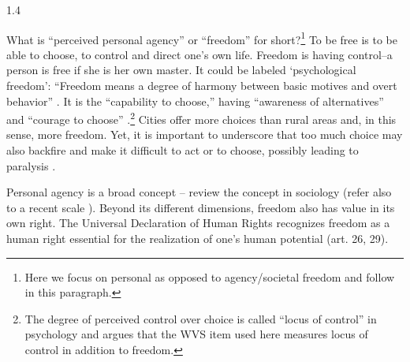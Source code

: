 \documentclass[10pt, letterpaper]{article}
\begin{document}
\begin{spacing}{1.4}
 
What is ``perceived personal agency'' or ``freedom'' for short?\footnote{Here we focus on personal as opposed to
  agency/societal freedom and follow \citet{aok_free_from_to} in this paragraph.} To be free is to be able to choose, to control and
direct one's own life. Freedom is having control--a person is free if she is her own master. It could be labeled `psychological freedom': ``Freedom means a degree of harmony between basic motives and overt behavior'' \citep[Bay 1970, p.83 cited in][]{aok_free_from_to}.
 It is the ``capability to choose,'' having ``awareness of alternatives'' and ``courage to choose'' \citep{veenhoven00_b}.\footnote{The degree of perceived control over choice is called ``locus of control'' in psychology and \citet{verme09} argues that the WVS item used here measures locus of control in addition to freedom.}
 Cities offer more choices than rural areas and, in this sense, more freedom. Yet, it is important to underscore that too much choice may also backfire and make it difficult to act or to choose, possibly leading to paralysis \citep{schwartz04}.

Personal agency is a broad concept%
--\citet{hitlin09} review the concept in sociology (refer also to a recent scale \citep{agencyScale25}). %
 Beyond its different dimensions, freedom also has value in its own right. The Universal Declaration of Human Rights recognizes freedom as a human right essential for the realization of one's human potential (art. 26, 29).


\end{spacing}
\end{document}
